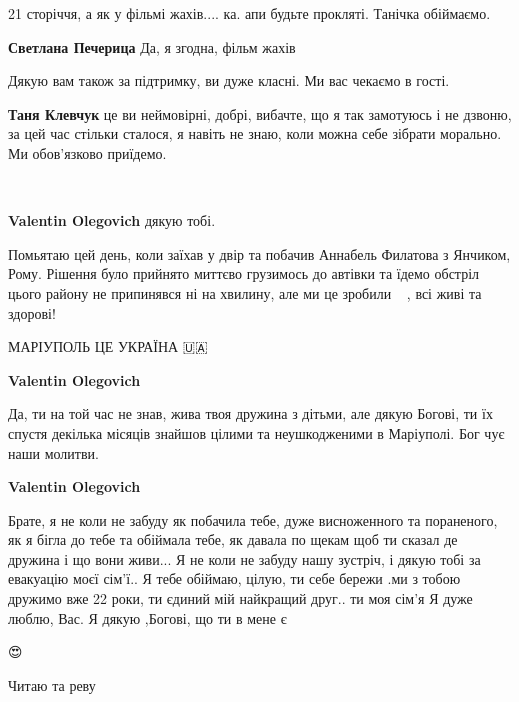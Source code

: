  
 
 
 
 

\qqSecCmt


21 сторіччя, а як у фільмі жахів.... ка. апи будьте прокляті. Танічка обіймаємо.

\begin{itemize} %
\textbf{Светлана Печерица} Да, я згодна, фільм жахів
\end{itemize} %


Дякую вам також за підтримку, ви дуже класні. Ми вас чекаємо в гості.

\begin{itemize} %
\textbf{Таня Клевчук} це ви неймовірні, добрі, вибачте, що я так замотуюсь і не дзвоню, за цей час стільки сталося, я навіть не знаю, коли можна себе зібрати морально. Ми обов'язково приїдемо.
\end{itemize} %


💛💙💪🏻🇺🇦

\begin{itemize} %
\textbf{Valentin Olegovich} дякую тобі.


Помьятаю цей день, коли заїхав у двір та побачив Аннабель Филатова з Янчиком,
Рому. Рішення було прийнято миттєво грузимось до автівки та їдемо обстріл цього
району не припинявся ні на хвилину, але ми це зробили💪🏻🇺🇦, всі живі та
здорові!

МАРІУПОЛЬ ЦЕ УКРАЇНА 🇺🇦

\textbf{Valentin Olegovich} 

Да, ти на той час не знав, жива твоя дружина з дітьми, але дякую Богові, ти їх
спустя декілька місяців знайшов цілими та неушкодженими в Маріуполі. Бог чує
наши молитви.

\textbf{Valentin Olegovich} 

Брате, я не коли не забуду як побачила тебе, дуже висноженного та пораненого, як
я бігла до тебе та обіймала тебе, як давала по щекам щоб ти сказал де дружина
і що вони живи... Я не коли не забуду нашу зустріч, і дякую тобі за евакуацію
моєї сім'ї.. Я тебе обіймаю, цілую, ти себе бережи .ми з тобою дружимо вже 22
роки, ти єдиний мій найкращий друг.. ти моя сім'я Я дуже люблю, Вас. Я дякую
,Богові, що ти в мене є💙💛🙏🏻

\end{itemize} %


😍💋💙💛💪🇺🇦


Читаю та реву

